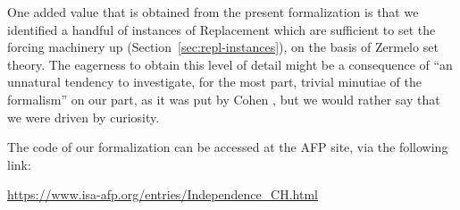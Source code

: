 One added value that is obtained from the present formalization is
that we identified a handful of instances of Replacement which are
sufficient to set the forcing machinery up
(Section~\ref{sec:repl-instances}), on the basis of Zermelo set theory.
The eagerness to obtain this level of detail might be a consequence of
“an unnatural tendency to investigate, for the most part, trivial
minutiae of the formalism” on our part, as it was put by Cohen
\cite{zbMATH02012060}, but we would rather say that we were driven by
curiosity.

The code of our formalization can be accessed at the
AFP site, via the following link:
\begin{center}
  \url{https://www.isa-afp.org/entries/Independence_CH.html}
\end{center}

